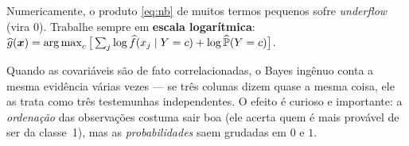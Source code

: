 \documentclass[11pt,a4paper]{article}
\begin{document}
\begin{atencao}
Numericamente, o produto \eqref{eq:nb} de muitos termos pequenos sofre
\emph{underflow} (vira $0$). Trabalhe sempre em \textbf{escala logarítmica}:
$\ghat(\x)=\argmax_c\big[\sum_j \log \widehat f(x_j\mid Y=c)+\log\widehat\Prob(Y=c)\big]$.
\end{atencao}

\begin{atencao}
Quando as covariáveis são de fato correlacionadas, o Bayes ingênuo conta a mesma
evidência várias vezes --- se três colunas dizem quase a mesma coisa, ele as trata
como três testemunhas independentes. O efeito é curioso e importante: a
\emph{ordenação} das observações costuma sair boa (ele acerta quem é mais provável
de ser da classe~1), mas as \emph{probabilidades} saem grudadas em $0$ e $1$.
\end{atencao}

\end{document}
